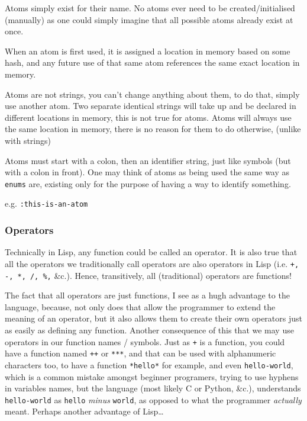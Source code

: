 \documentclass{article}
\newcommand{\code}[1]{\texttt{#1}}
\newcommand{\etc}{{\&}c.}
\begin{document}
      Atoms simply exist for their name.
      No atoms ever need to be created/initialised (manually) as
      one could simply imagine that all
      possible atoms already exist at once.

      When an atom is first used, it is assigned
      a location in memory based on some hash, and
      any future use of that same atom
      references the same exact location in memory.

      Atoms are not strings, you can't change anything
      about them, to do that, simply use another atom.
      Two separate identical strings will take up and be
      declared in different locations in memory, this is
      not true for atoms. Atoms will always use the same
      location in memory, there is no reason for them to
      do otherwise, (unlike with strings)

      Atoms must start with a colon, then an identifier
      string, just like symbols (but with a colon in front).
      One may think of atoms as being used the same way
      as \code{enums} are, existing only for the purpose of
      having a way to identify something.\\

      \centerline{e.g. \code{:this-is-an-atom}}

    \subsubsection{Operators}
      Technically in Lisp, any function could be called an operator.
      It is also true that all the operators we traditionally call operators
      are also operators in Lisp (i.e. \code{+, -, *, /, \%,} \etc).
      Hence, transitively, all (traditional) operators are functions!

      The fact that all operators are just functions, I see as a hugh advantage
      to the language, because, not only does that allow the programmer to
      extend the meaning of an operator, but it also allows them to create their
      own operators just as easily as defining any function. Another consequence
      of this that we may use operators in our function names / symbols.
      Just as \code{+} is a function, you could have a function named \code{++}
      or \code{***}, and that can be used with alphanumeric characters too, to
      have a function \code{*hello*} for example, and even \code{hello-world},
      which is a common mistake amongst beginner programers, trying to use hyphens
      in variables names, but the language (most likely C or Python, \etc),
      understands \code{hello-world} as \code{hello} \emph{minus} \code{world},
      as opposed to what the programmer \emph{actually} meant. Perhaps another
      advantage of Lisp\ldots
\end{document}
